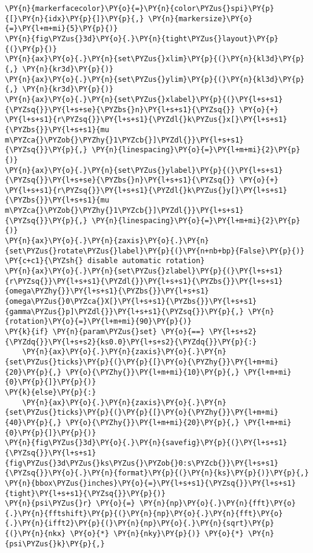 \begin{Verbatim}[commandchars=\\\{\}]
            \PY{n}{markerfacecolor}\PY{o}{=}\PY{n}{color\PYZus{}spi}\PY{p}{[}\PY{n}{idx}\PY{p}{]}\PY{p}{,} \PY{n}{markersize}\PY{o}{=}\PY{l+m+mi}{5}\PY{p}{)}
\PY{n}{fig\PYZus{}3d}\PY{o}{.}\PY{n}{tight\PYZus{}layout}\PY{p}{(}\PY{p}{)}
\PY{n}{ax}\PY{o}{.}\PY{n}{set\PYZus{}xlim}\PY{p}{(}\PY{n}{kl3d}\PY{p}{,} \PY{n}{kr3d}\PY{p}{)}
\PY{n}{ax}\PY{o}{.}\PY{n}{set\PYZus{}ylim}\PY{p}{(}\PY{n}{kl3d}\PY{p}{,} \PY{n}{kr3d}\PY{p}{)}
\PY{n}{ax}\PY{o}{.}\PY{n}{set\PYZus{}xlabel}\PY{p}{(}\PY{l+s+s1}{\PYZsq{}}\PY{l+s+se}{\PYZbs{}n}\PY{l+s+s1}{\PYZsq{}} \PY{o}{+} \PY{l+s+s1}{r\PYZsq{}}\PY{l+s+s1}{\PYZdl{}k\PYZus{}x[}\PY{l+s+s1}{\PYZbs{}}\PY{l+s+s1}{mu m\PYZca{}\PYZob{}\PYZhy{}1\PYZcb{}]\PYZdl{}}\PY{l+s+s1}{\PYZsq{}}\PY{p}{,} \PY{n}{linespacing}\PY{o}{=}\PY{l+m+mi}{2}\PY{p}{)}
\PY{n}{ax}\PY{o}{.}\PY{n}{set\PYZus{}ylabel}\PY{p}{(}\PY{l+s+s1}{\PYZsq{}}\PY{l+s+se}{\PYZbs{}n}\PY{l+s+s1}{\PYZsq{}} \PY{o}{+} \PY{l+s+s1}{r\PYZsq{}}\PY{l+s+s1}{\PYZdl{}k\PYZus{}y[}\PY{l+s+s1}{\PYZbs{}}\PY{l+s+s1}{mu m\PYZca{}\PYZob{}\PYZhy{}1\PYZcb{}]\PYZdl{}}\PY{l+s+s1}{\PYZsq{}}\PY{p}{,} \PY{n}{linespacing}\PY{o}{=}\PY{l+m+mi}{2}\PY{p}{)}
\PY{n}{ax}\PY{o}{.}\PY{n}{zaxis}\PY{o}{.}\PY{n}{set\PYZus{}rotate\PYZus{}label}\PY{p}{(}\PY{n+nb+bp}{False}\PY{p}{)}  \PY{c+c1}{\PYZsh{} disable automatic rotation}
\PY{n}{ax}\PY{o}{.}\PY{n}{set\PYZus{}zlabel}\PY{p}{(}\PY{l+s+s1}{r\PYZsq{}}\PY{l+s+s1}{\PYZdl{}}\PY{l+s+s1}{\PYZbs{}}\PY{l+s+s1}{omega\PYZhy{}}\PY{l+s+s1}{\PYZbs{}}\PY{l+s+s1}{omega\PYZus{}0\PYZca{}X[}\PY{l+s+s1}{\PYZbs{}}\PY{l+s+s1}{gamma\PYZus{}p]\PYZdl{}}\PY{l+s+s1}{\PYZsq{}}\PY{p}{,} \PY{n}{rotation}\PY{o}{=}\PY{l+m+mi}{90}\PY{p}{)}
\PY{k}{if} \PY{n}{param\PYZus{}set} \PY{o}{==} \PY{l+s+s2}{\PYZdq{}}\PY{l+s+s2}{ks0.0}\PY{l+s+s2}{\PYZdq{}}\PY{p}{:}
    \PY{n}{ax}\PY{o}{.}\PY{n}{zaxis}\PY{o}{.}\PY{n}{set\PYZus{}ticks}\PY{p}{(}\PY{p}{[}\PY{o}{\PYZhy{}}\PY{l+m+mi}{20}\PY{p}{,} \PY{o}{\PYZhy{}}\PY{l+m+mi}{10}\PY{p}{,} \PY{l+m+mi}{0}\PY{p}{]}\PY{p}{)}
\PY{k}{else}\PY{p}{:}
    \PY{n}{ax}\PY{o}{.}\PY{n}{zaxis}\PY{o}{.}\PY{n}{set\PYZus{}ticks}\PY{p}{(}\PY{p}{[}\PY{o}{\PYZhy{}}\PY{l+m+mi}{40}\PY{p}{,} \PY{o}{\PYZhy{}}\PY{l+m+mi}{20}\PY{p}{,} \PY{l+m+mi}{0}\PY{p}{]}\PY{p}{)}
\PY{n}{fig\PYZus{}3d}\PY{o}{.}\PY{n}{savefig}\PY{p}{(}\PY{l+s+s1}{\PYZsq{}}\PY{l+s+s1}{fig\PYZus{}3d\PYZus{}ks\PYZus{}\PYZob{}0:s\PYZcb{}}\PY{l+s+s1}{\PYZsq{}}\PY{o}{.}\PY{n}{format}\PY{p}{(}\PY{n}{ks}\PY{p}{)}\PY{p}{,} \PY{n}{bbox\PYZus{}inches}\PY{o}{=}\PY{l+s+s1}{\PYZsq{}}\PY{l+s+s1}{tight}\PY{l+s+s1}{\PYZsq{}}\PY{p}{)}
\PY{n}{psi\PYZus{}r} \PY{o}{=} \PY{n}{np}\PY{o}{.}\PY{n}{fft}\PY{o}{.}\PY{n}{fftshift}\PY{p}{(}\PY{n}{np}\PY{o}{.}\PY{n}{fft}\PY{o}{.}\PY{n}{ifft2}\PY{p}{(}\PY{n}{np}\PY{o}{.}\PY{n}{sqrt}\PY{p}{(}\PY{n}{nkx} \PY{o}{*} \PY{n}{nky}\PY{p}{)} \PY{o}{*} \PY{n}{psi\PYZus{}k}\PY{p}{,}

\end{Verbatim}
